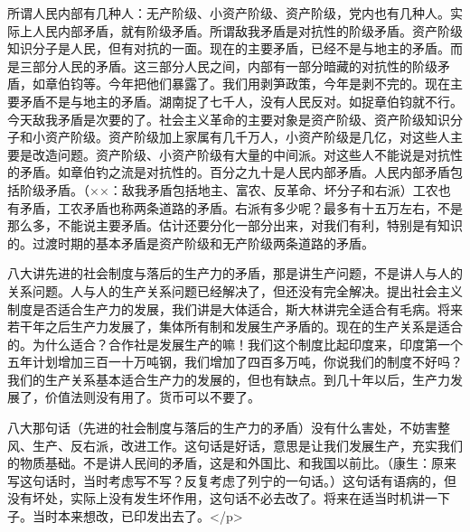 所谓人民内部有几种人：无产阶级、小资产阶级、资产阶级，党内也有几种人。实际上人民内部矛盾，就有阶级矛盾。所谓敌我矛盾是对抗性的阶级矛盾。资产阶级知识分子是人民，但有对抗的一面。现在的主要矛盾，已经不是与地主的矛盾。而是三部分人民的矛盾。这三部分人民之间，内部有一部分暗藏的对抗性的阶级矛盾，如章伯钧等。今年把他们暴露了。我们用剥笋政策，今年是剥不完的。现在主要矛盾不是与地主的矛盾。湖南捉了七千人，没有人民反对。如捉章伯钧就不行。今天敌我矛盾是次要的了。社会主义革命的主要对象是资产阶级、资产阶级知识分子和小资产阶级。资产阶级加上家属有几千万人，小资产阶级是几亿，对这些人主要是改造问题。资产阶级、小资产阶级有大量的中间派。对这些人不能说是对抗性的矛盾。如章伯钓之流是对抗性的。百分之九十是人民内部矛盾。人民内部矛盾包括阶级矛盾。（××：敌我矛盾包括地主、富农、反革命、坏分子和右派）工农也有矛盾，工农矛盾也称两条道路的矛盾。右派有多少呢？最多有十五万左右，不是那么多，不能说主要矛盾。估计还要分化一部分出来，对我们有利，特别是有知识的。过渡时期的基本矛盾是资产阶级和无产阶级两条道路的矛盾。

八大讲先进的社会制度与落后的生产力的矛盾，那是讲生产问题，不是讲人与人的关系问题。人与人的生产关系问题已经解决了，但还没有完全解决。提出社会主义制度是否适合生产力的发展，我们讲是大体适合，斯大林讲完全适合有毛病。将来若干年之后生产力发展了，集体所有制和发展生产矛盾的。现在的生产关系是适合的。为什么适合？合作社是发展生产的嘛！我们这个制度比起印度来，印度第一个五年计划增加三百一十万吨钢，我们增加了四百多万吨，你说我们的制度不好吗？我们的生产关系基本适合生产力的发展的，但也有缺点。到几十年以后，生产力发展了，价值法则没有用了。货币可以不要了。

八大那句话（先进的社会制度与落后的生产力的矛盾）没有什么害处，不妨害整风、生产、反右派，改进工作。这句话是好话，意思是让我们发展生产，充实我们的物质基础。不是讲人民间的矛盾，这是和外国比、和我国以前比。（康生：原来写这句话时，当时考虑写不写？反复考虑了列宁的一句话。）这句话有语病的，但没有坏处，实际上没有发生坏作用，这句话不必去改了。将来在适当时机讲一下子。当时本来想改，已印发出去了。</p>

